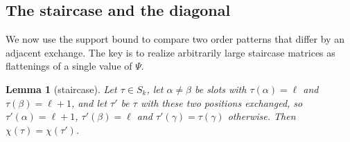 \documentclass[11pt]{amsart}
\newtheorem{lemma}[theorem]{Lemma}
\theoremstyle{definition}
\theoremstyle{remark}
\numberwithin{equation}{section}
\begin{document}
\subsection{The staircase and the diagonal}

We now use the support bound to compare two order patterns that differ by an adjacent exchange. The key is to
realize arbitrarily large staircase matrices as flattenings of a single value of $\Psi$.

\begin{lemma}[staircase]\label{lem:S}
Let $\tau\in S_k$, let $\alpha\neq\beta$ be slots with $\tau(\alpha)=\ell$ and $\tau(\beta)=\ell+1$, and let $\tau'$ be $\tau$
with these two positions exchanged, so $\tau'(\alpha)=\ell+1$, $\tau'(\beta)=\ell$ and $\tau'(\gamma)=\tau(\gamma)$ otherwise.
Then $\chi(\tau)=\chi(\tau')$.
\end{lemma}
\end{document}
